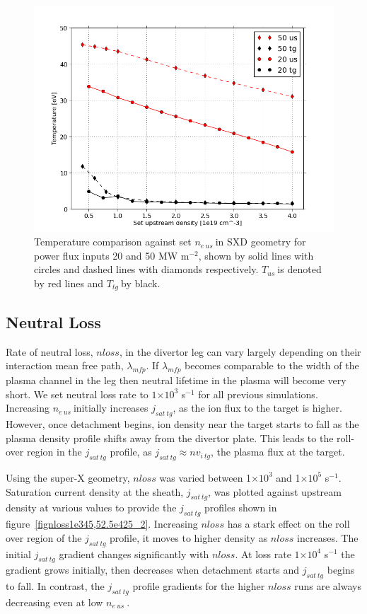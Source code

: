 \documentclass[12pt]{article}  %
\providecommand{\e}[1]{\ensuremath{\times 10^{#1}}} %
\providecommand{\pow}[1]{{$^{#1}$}} %
\providecommand{\neus}{$n_{e~us}~$} %
\providecommand{\Tus}{$T_{us}~$} %
\providecommand{\Ttg}{$T_{tg}~$} %
\begin{document}
\begin{figure}
\includegraphics[scale=0.5]{Figures/sol1d/SXDPFTT.png}
\centering
\caption{Temperature comparison against set \neus in SXD geometry for power flux inputs 20 and 50 MW m\pow{-2}, shown by solid lines with circles and dashed lines with diamonds respectively. \Tus is denoted by red lines and \Ttg by black.}\label{figSXDPFTT}
\end{figure}


\subsection{Neutral Loss}\label{ssecNloss}
Rate of neutral loss, $nloss$, in the divertor leg can vary largely depending on their interaction mean free path, $\lambda_{mfp}$. If $\lambda_{mfp}$ becomes comparable to the width of the plasma channel in the leg then neutral lifetime in the plasma will become very short. We set neutral loss rate to $1\e{3}$ s\pow{-1} for all previous simulations. Increasing \neus initially increases $j_{sat~tg}$, as the ion flux to the target is higher. However, once detachment begins, ion density near the target starts to fall as the plasma density profile shifts away from the divertor plate. This leads to the roll-over region in the $j_{sat~tg}$ profile, as $j_{sat~tg} \approx nv_{i~tg}$, the plasma flux at the target.

Using the super-X geometry, $nloss$ was varied between 1\e{3} and 1\e{5} s\pow{-1}. Saturation current density at the sheath, $j_{sat~tg}$, was plotted against upstream density at various values to provide the $j_{sat~tg}$ profiles shown in figure~\ref{fignloss1e345,52.5e425_2}. Increasing $nloss$ has a stark effect on the roll over region of the $j_{sat~tg}$ profile, it moves to higher density as $nloss$ increases. The initial $j_{sat~tg}$ gradient changes significantly with $nloss$. At loss rate $1\e{4}$ s\pow{-1} the gradient grows initially, then decreases when detachment starts and $j_{sat~tg}$ begins to fall. In contrast, the $j_{sat~tg}$ profile gradients for the higher $nloss$ runs are always decreasing even at low \neus. 
\end{document}
